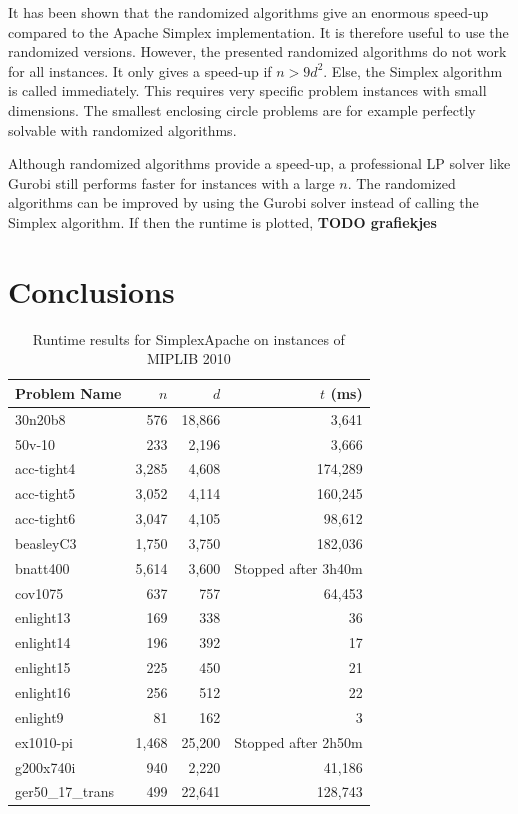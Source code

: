\documentclass[nocopyrightspace]{acm_proc_article-sp}
\begin{document}
It has been shown that the randomized algorithms give an enormous speed-up compared to the Apache Simplex implementation. It is therefore useful to use the randomized versions. However, the presented randomized algorithms do not work for all instances. It only gives a speed-up if $n>9d^2$. Else, the Simplex algorithm is called immediately. This requires very specific problem instances with small dimensions. The smallest enclosing circle problems are for example perfectly solvable with randomized algorithms.

Although randomized algorithms provide a speed-up, a professional LP solver like Gurobi still performs faster for instances with a large $n$. The randomized algorithms can be improved by using the Gurobi solver instead of calling the Simplex algorithm. If then the runtime is plotted, \textbf{TODO grafiekjes}

\section{Conclusions}



\balancecolumns

\appendix
\begin{table}[h!]
\label{tab:miplibresults}
\caption{Runtime results for SimplexApache on instances of MIPLIB 2010 \cite{KochEtAl2011}}
\begin{tabularx}{\columnwidth}{|X|r|r|r|}
\hline
Problem Name     & $n$  & $d$   & $t$ (ms) \\ \hline
30n20b8          & 576  & 18,866 & 3,641   \\ \hline
50v-10           & 233  & 2,196  & 3,666   \\ \hline
acc-tight4       & 3,285 & 4,608  & 174,289 \\ \hline
acc-tight5       & 3,052 & 4,114  & 160,245 \\ \hline
acc-tight6       & 3,047 & 4,105  & 98,612  \\ \hline
beasleyC3        & 1,750 & 3,750  & 182,036 \\ \hline
bnatt400         & 5,614 & 3,600 & Stopped after 3h40m \\ \hline
cov1075          & 637  & 757   & 64,453  \\ \hline
enlight13        & 169  & 338   & 36     \\ \hline
enlight14        & 196  & 392   & 17     \\ \hline
enlight15        & 225  & 450   & 21     \\ \hline
enlight16        & 256  & 512   & 22     \\ \hline
enlight9         & 81   & 162   & 3      \\ \hline
ex1010-pi		 & 1,468 & 25,200 & Stopped after 2h50m \\ \hline
g200x740i        & 940  & 2,220  & 41,186  \\ \hline
ger50\_17\_trans & 499  & 22,641 & 128,743 \\ \hline
\end{tabularx}
\end{table}
\end{document}
